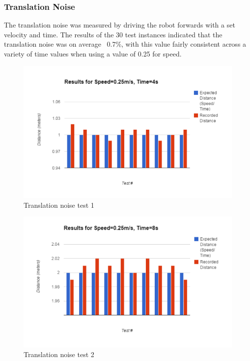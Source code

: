 \documentclass{article}
\begin{document}
	\subsubsection{Translation Noise}
	The translation noise was measured by driving the robot forwards with a set velocity and time. The results of the 30 test instances indicated that the translation noise was on average ~0.7\%, with this value fairly consistent across a variety of time values when using a value of 0.25 for speed.
	\begin{figure}[H]
	\centering
	\includegraphics[width=\linewidth]{ExperimentalResults1}
	\caption{Translation noise test 1}
	\end{figure}
	\begin{figure}[H]
	\centering
	\includegraphics[width=\linewidth]{ExperimentalResults2}
	\caption{Translation noise test 2}
	\end{figure}
\end{document}
